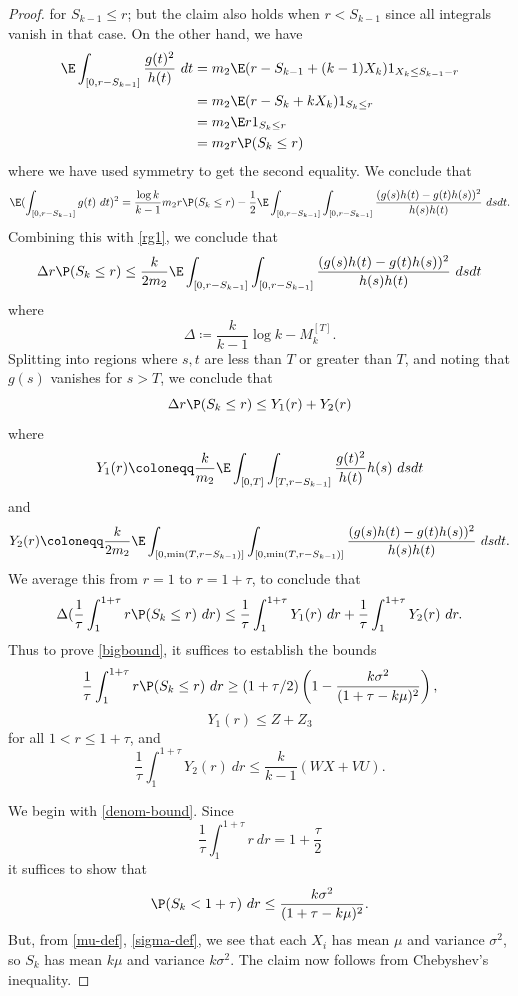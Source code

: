 \begin{proof}
for $S_{k-1} \leq r$; but the claim also holds when $r < S_{k-1}$ since all integrals vanish in that case.  On the other hand, we have
\begin{align*}
\E \int_{[0,r-S_{k-1}]} \frac{g(t)^2}{h(t)}\ dt &= m_2 \E (r - S_{k-1} + (k-1) X_k) 1_{X_k \leq S_{k-1} - r}\\
&= m_2 \E (r - S_k + k X_k) 1_{S_k \leq r} \\
&= m_2 \E r 1_{S_k \leq r} \\
&= m_2 r \P( S_k \leq r)
\end{align*}
where we have used symmetry to get the second equality.  We conclude that
$$ \E (\int_{[0,r-S_{k-1}]} g(t)\ dt)^2 = \frac{\log k}{k-1} m_2 r \P(S_k \leq r) - \frac{1}{2} \E \int_{[0,r-S_{k-1}]} \int_{[0,r-S_{k-1}]} \frac{(g(s)h(t)-g(t)h(s))^2}{h(s)h(t)}\ ds dt.$$
Combining this with \eqref{rg1}, we conclude that
$$
\Delta r \P( S_k \leq r) \leq \frac{k}{2m_2}
\E \int_{[0,r-S_{k-1}]} \int_{[0,r-S_{k-1}]} \frac{(g(s)h(t)-g(t)h(s))^2}{h(s)h(t)}\ ds dt
$$
where
$$ \Delta \coloneqq \frac{k}{k-1} \log k - M_k^{[T]}.$$
Splitting into regions where $s,t$ are less than $T$ or greater than $T$, and noting that $g(s)$ vanishes for $s > T$, we conclude that
$$
\Delta r \P( S_k \leq r) \leq Y_1(r) + Y_2(r)$$
where 
$$ Y_1(r) \coloneqq \frac{k}{m_2} \E \int_{[0,T]} \int_{[T,r-S_{k-1}]} \frac{g(t)^2}{h(t)} h(s)\ ds dt $$
and
$$ Y_2(r) \coloneqq \frac{k}{2m_2} \E \int_{[0,\min(T,r-S_{k-1})]} \int_{[0,\min(T,r-S_{k-1})]} \frac{(g(s)h(t)-g(t)h(s))^2}{h(s)h(t)}\ ds dt.$$
We average this from $r=1$ to $r=1+\tau$, to conclude that
$$
\Delta (\frac{1}{\tau} \int_1^{1+\tau} r \P( S_k \leq r)\ dr) \leq \frac{1}{\tau} \int_1^{1+\tau} Y_1(r)\ dr + 
\frac{1}{\tau} \int_1^{1+\tau} Y_2(r)\ dr.$$
Thus to prove \eqref{bigbound}, it suffices to establish the bounds
\begin{equation}\label{denom-bound}
\frac{1}{\tau} \int_1^{1+\tau} r \P( S_k \leq r)\ dr \geq 
(1+\tau/2) \left(1 - \frac{k\sigma^2}{(1+\tau-k\mu)^2}\right),
\end{equation}
\begin{equation}\label{y1-bound}
Y_1(r) \leq Z + Z_3
\end{equation}
for all $1 < r \leq 1+\tau$, and
\begin{equation}\label{y2-bound}
\frac{1}{\tau} \int_1^{1+\tau} Y_2(r)\ dr \leq \frac{k}{k-1}( WX+VU ).
\end{equation}

We begin with \eqref{denom-bound}.  Since
$$ \frac{1}{\tau} \int_1^{1+\tau} r\ dr = 1+\frac{\tau}{2}$$
it suffices to show that
$$
\P( S_k < 1+\tau)\ dr \leq \frac{k\sigma^2}{(1+\tau-k\mu)^2}.
$$
But, from \eqref{mu-def}, \eqref{sigma-def}, we see that each $X_i$ has mean $\mu$ and variance $\sigma^2$, so $S_k$ has mean $k\mu$ and variance $k\sigma^2$.  The claim now follows from Chebyshev's inequality.


\end{proof}
